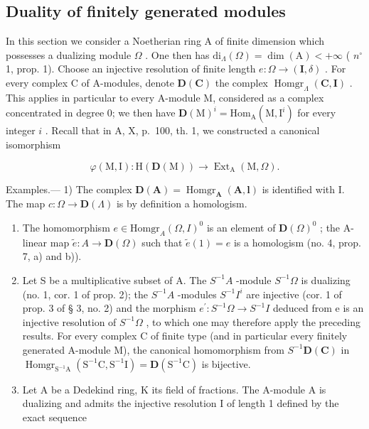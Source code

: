\subsection{Duality of finitely generated modules}

In this section we consider a Noetherian ring A of finite dimension which possesses a dualizing module \(\Omega\) . One then has \(\mathrm{di}_{\Lambda}(\Omega) = \dim(\mathrm{A}) < +\infty\) ( \(n^{\circ}\) 1, prop. 1). Choose an injective resolution of finite length \(e: \Omega \to (\mathbf{I}, \delta)\) . For every complex C of A-modules, denote \(\mathbf{D}(\mathbf{C})\) the complex \(\operatorname{Homgr}_{\Lambda}(\mathbf{C}, \mathbf{I})\) . This applies in particular to every A-module M, considered as a complex concentrated in degree 0; we then have \(\mathbf{D}(\mathrm{M})^{i} = \mathrm{Hom}_{\mathrm{A}}(\mathrm{M},\mathrm{I}^{i})\) for every integer \(i\) . Recall that in A, X, p.~100, th. 1, we constructed a canonical isomorphism

\[
\varphi (\mathrm{M}, \mathrm{I}): \mathrm{H} (\mathbf {D} (\mathrm{M})) \longrightarrow \operatorname{Ext} _ {\mathrm{A}} (\mathrm{M}, \Omega).
\]

Examples.--- 1) The complex \(\mathbf{D}(\mathbf{A}) = \operatorname{Homgr}_{\mathbf{A}}(\mathbf{A},\mathbf{l})\) is identified with I. The map \(c:\Omega \to \mathbf{D}(\Lambda)\) is by definition a homologism.

\begin{enumerate}
\def\labelenumi{\arabic{enumi})}
\setcounter{enumi}{1}
\item
  The homomorphism \(e \in \text{Homgr}_A(\Omega, I)^0\) is an element of \(\mathbf{D}(\Omega)^0\) ; the A-linear map \(\tilde{e}: A \to \mathbf{D}(\Omega)\) such that \(\tilde{e}(1) = e\) is a homologism (no. 4, prop. 7, a) and b)).
\item
  Let S be a multiplicative subset of A. The \(S^{-1}A\) -module \(S^{-1}\Omega\) is dualizing (no. 1, cor. 1 of prop. 2); the \(S^{-1}A\) -modules \(S^{-1}I^{i}\) are injective (cor. 1 of prop. 3 of § 3, no. 2) and the morphism \(e^{\prime}:S^{-1}\Omega\to S^{-1}I\) deduced from e is an injective resolution of \(S^{-1}\Omega\) , to which one may therefore apply the preceding results. For every complex C of finite type (and in particular every finitely generated A-module M), the canonical homomorphism from \(S^{-1}\mathbf{D}(\mathbf{C})\) in \(\operatorname{Homgr}_{\mathrm{S}^{-1}\mathrm{A}}(\mathrm{S}^{-1}\mathrm{C},\mathrm{S}^{-1}\mathrm{I})=\mathbf{D}(\mathrm{S}^{-1}\mathrm{C})\) is bijective.
\item
  Let A be a Dedekind ring, K its field of fractions. The A-module A is dualizing and admits the injective resolution I of length 1 defined by the exact sequence
\end{enumerate}

